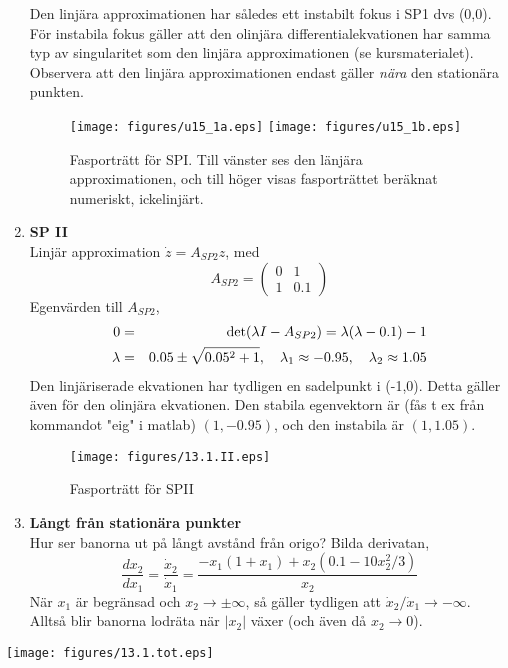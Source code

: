 \begin{enumerate}
Den linjära approximationen har således ett instabilt
fokus i SP1 dvs (0,0). För instabila fokus gäller att
den olinjära differentialekvationen har samma typ av
singularitet som den linjära approximationen (se kursmaterialet). 
Observera att den linjära approximationen endast gäller 
\emph{nära} den stationära punkten.

\begin{figure}
\centering
\texttt{[image: figures/u15\_1a.eps]}
\texttt{[image: figures/u15\_1b.eps]}
\caption{Fasporträtt för SPI. Till vänster ses den länjära approximationen, och till höger visas fasporträttet beräknat numeriskt, ickelinjärt.}
\end{figure}

\item {\bf SP II} \\
Linjär approximation $\dot{z} = A_{SP2}z$, med
$$
A_{SP2} = \begin{pmatrix} 0 & 1 \\ 1 & 0.1 \end{pmatrix}
$$
Egenvärden till $A_{SP2}$,
\begin{eqnarray*}
0 &=& {\rm det}(\lambda I -A_{SP2}) = \lambda (\lambda -0.1) - 1 \\
\lambda &=& 0.05 \pm \sqrt{0.05^2 + 1}, \quad \lambda_1 \approx -0.95, \quad
\lambda_2 \approx 1.05 
\end{eqnarray*}
Den linjäriserade ekvationen har tydligen en sadelpunkt
i (-1,0). Detta gäller även för den olinjära
ekvationen.
Den stabila egenvektorn är (fås t ex från kommandot "eig" i matlab)  $(1,-0.95)$, och den instabila
är $(1,1.05)$.

\begin{figure}[ht]
\centering
\texttt{[image: figures/13.1.II.eps]}
\caption{Fasporträtt för SPII}
\end{figure}

\item{\bf Långt från stationära punkter} \\
Hur ser banorna ut på långt avstånd från origo? 
Bilda derivatan,
$$
\frac{d x_2}{d x_1} =
\frac{\dot{x}_2}{\dot{x}_1} = \frac{-x_1(1+x_1) + 
x_2(0.1 -10x_2^2/3)}{x_2} 
$$
När $x_1$ är begränsad och
$x_2 \rightarrow \pm \infty $, så gäller tydligen
att $\dot{x}_2/\dot{x}_1 \rightarrow -\infty$. Alltså blir
banorna lodräta när $|x_2|$ växer (och även
då $x_2 \rightarrow 0$).
\end{enumerate}

\begin{center} \texttt{[image: figures/13.1.tot.eps]} \end{center}

